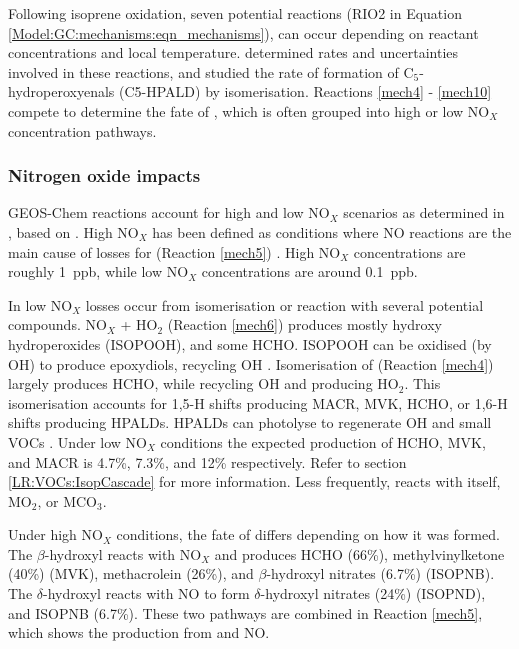       Following isoprene oxidation, seven potential \roo reactions (RIO2 in Equation \ref{Model:GC:mechanisms:eqn_mechanisms}), can occur depending on reactant concentrations and local temperature.
      \textcite{Crounse2011} determined rates and uncertainties involved in these reactions, and studied the rate of formation of C$_5$-hydroperoxyenals (C5-HPALD) by isomerisation.
      Reactions \ref{mech4} - \ref{mech10} compete to determine the fate of \roo, which is often grouped into high or low NO$_X$ concentration pathways.
      
    
    \subsubsection{Nitrogen oxide impacts}
    
      GEOS-Chem reactions account for high and low NO$_X$ scenarios as determined in \textcite{Mao2013}, based on \textcite{Paulot2009a}.
      High NO$_X$ has been defined as conditions where NO reactions are the main cause of losses for \roo (Reaction \ref{mech5}) \parencite{Palmer2003}.
      High NO$_X$ concentrations are roughly 1~ppb, while low NO$_X$ concentrations are around 0.1~ppb.
      
      In low NO$_X$ \roo losses occur from isomerisation or reaction with several potential compounds.
      NO$_X$ + HO$_2$ (Reaction \ref{mech6}) produces mostly hydroxy hydroperoxides (ISOPOOH), and some HCHO.
      ISOPOOH can be oxidised (by OH) to produce epoxydiols, recycling OH \parencite{Paulot2009b}. 
      Isomerisation of \roo (Reaction \ref{mech4}) largely produces HCHO, while recycling OH and producing HO$_2$.
      This isomerisation accounts for 1,5-H shifts producing MACR, MVK, HCHO, or 1,6-H shifts producing HPALDs.
      HPALDs can photolyse to regenerate OH and small VOCs \parencite{Crounse2011,Wolfe2012, Peeters2014}.
      Under low NO$_X$ conditions the expected production of HCHO, MVK, and MACR is 4.7\%, 7.3\%, and 12\% respectively.
      Refer to section \ref{LR:VOCs:IsopCascade} for more information.
      Less frequently, \roo reacts with itself, MO$_2$, or MCO$_3$.
      
      Under high NO$_X$ conditions, the fate of \roo differs depending on how it was formed.
      The $\beta$-hydroxyl reacts with NO$_X$ and produces HCHO (66\%), methylvinylketone (40\%) (MVK), methacrolein (26\%), and $\beta$-hydroxyl nitrates (6.7\%) (ISOPNB).
      The $\delta$-hydroxyl reacts with NO to form $\delta$-hydroxyl nitrates (24\%) (ISOPND), and ISOPNB (6.7\%).
      These two pathways are combined in Reaction \ref{mech5}, which shows the production from \roo and NO.
      
